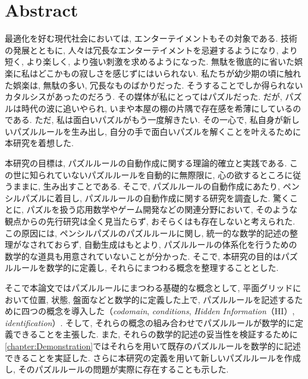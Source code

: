 \chapter*{{\rm \bf Abstract}}\label{chapter:Abstract}
最適化を好む現代社会においては, エンターテイメントもその対象である. 技術の発展とともに, 人々は冗長なエンターテイメントを忌避するようになり, より短く, より楽しく, より強い刺激を求めるようになった. 無駄を徹底的に省いた娯楽に私はどこかもの寂しさを感じずにはいられない. 私たちが幼少期の頃に触れた娯楽は, 無駄の多い, 冗長なものばかりだった. そうすることでしか得られないカタルシスがあったのだろう. その媒体が私にとってはパズルだった. だが, パズルは時代の波に追いやられ, いまや本屋の棚の片隅で存在感を希薄にしているのである. ただ, 私は面白いパズルがもう一度解きたい. その一心で, 私自身が新しいパズルルールを生み出し, 自分の手で面白いパズルを解くことを叶えるために本研究を着想した.


本研究の目標は, パズルルールの自動作成に関する理論的確立と実践である. この世に知られていないパズルルールを自動的に無際限に, 心の欲するところに従うままに, 生み出すことである. そこで, パズルルールの自動作成にあたり, ペンシルパズルに着目し, パズルルールの自動作成に関する研究を調査した. 驚くことに, パズルを扱う応用数学やゲーム開発などの関連分野において, そのような観点からの先行研究は全く見当たらず, おそらくはも存在しないと考えられた. この原因には, ペンシルパズルのパズルルールに関し, 統一的な数学的記述の整理がなされておらず, 自動生成はもとより, パズルルールの体系化を行うための数学的な道具も用意されていないことが分かった. そこで, 本研究の目的はパズルルールを数学的に定義し, それらにまつわる概念を整理することとした.

そこで本論文ではパズルルールにまつわる基礎的な概念として, 平面グリッドにおいて位置, 状態, 盤面などと数学的に定義した上で, パズルルールを記述するために四つの概念を導入した（\textit{codomain}, \textit{conditions}, \textit{Hidden Information}（HI）, \textit{identification}）. そして, それらの概念の組み合わせでパズルルールが数学的に定義できることを主張した. また, それらの数学的記述の妥当性を検証するために\cref{chapter:Demonstration}ではそれらを用いて既存のパズルルールを数学的に記述できることを実証した. さらに本研究の定義を用いて新しいパズルルールを作成し, そのパズルルールの問題が実際に存在することも示した.

